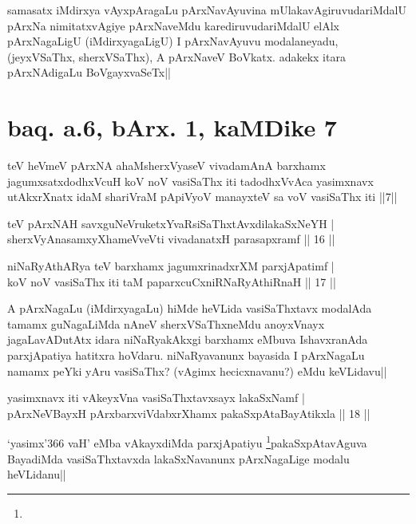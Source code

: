\begin{artha}
samasatx iMdirxya vAyxpAragaLu pArxNavAyuvina mUlakavAgiruvudariMdalU 
pArxNa nimitatxvAgiye pArxNaveMdu karediruvudariMdalU elAlx 
pArxNagaLigU (iMdirxyagaLigU) I pArxNavAyuvu modalaneyadu, 
(jeyxVSaThx, sherxVSaThx), A pArxNaveV BoVkatx. adakekx itara 
pArxNAdigaLu BoVgayxvaSeTx||
\end{artha}

\section*{baq. a.6, bArx. 1, kaMDike 7}

\begin{shl}
teV heVmeV pArxNA ahaMsherxVyaseV vivadamAnA barxhamx jagumxsatxdodhxVcuH koV noV vasiSaThx iti tadodhxVvAca yasimxnavx utAkxrXnatx idaM shariVraM pApiVyoV manayxteV sa voV vasiSaThx iti ||7||
\end{shl}


\begin{shl}
teV pArxNAH savxguNeVruketxYvaRsiSaThxtAvxdilakaSxNeYH | \\
sherxVyAnasamxyXhameVveVti vivadanatxH parasapxramf \hfill|| 16 || 
\end{shl}

\begin{shl}
niNaRyAthARya teV barxhamx jagumxrinadxrXM parxjApatimf | \\
koV noV vasiSaThx iti taM paparxcuCxniRNaRyAthiRnaH \hfill|| 17 || 
\end{shl}

\begin{artha}
A pArxNagaLu (iMdirxyagaLu) hiMde heVLida vasiSaThxtavx modalAda 
tamamx guNagaLiMda nAneV sherxVSaThxneMdu anoyxVnayx jagaLavADutAtx 
idara niNaRyakAkxgi barxhamx eMbuva IshavxranAda parxjApatiya hatitxra 
hoVdaru. niNaRyavanunx bayasida I pArxNagaLu namamx peYki yAru 
vasiSaThx? (vAgimx hecicxnavanu?) eMdu keVLidavu||
\end{artha}


\begin{shl}
yasimxnavx iti vAkeyxVna vasiSaThxtavxsayx lakaSxNamf | \\
pArxNeVBayxH pArxbarxviVdabxrXhamx pakaSxpAtaBayAtikxla \hfill|| 18 || 
\end{shl}


\begin{artha}
`yasimx\char'366 vaH' eMba vAkayxdiMda parxjApatiyu \footnote[1]{}pakaSxpAtavAguva 
BayadiMda vasiSaThxtavxda lakaSxNavanunx pArxNagaLige modalu 
heVLidanu||
\end{artha}

